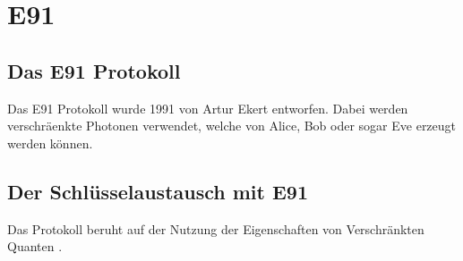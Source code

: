 \section{E91}
  \subsection{Das E91 Protokoll}
  Das E91 Protokoll wurde 1991 von Artur Ekert entworfen.
  Dabei werden verschr\"aenkte Photonen verwendet, welche von Alice, Bob oder sogar Eve erzeugt werden k\"onnen.

  \subsection{Der Schl\"usselaustausch mit E91}
  Das Protokoll beruht auf der Nutzung der Eigenschaften von Verschr\"ankten Quanten \cite{qc:verschraenkung}.
